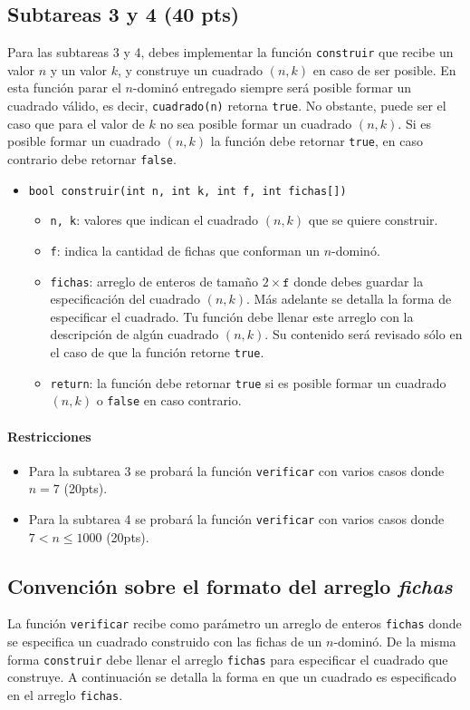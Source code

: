 \documentclass{oci}
\begin{document}
\subsection*{Subtareas 3 y 4 (40 pts)}
Para las subtareas 3 y 4, debes implementar la función \verb+construir+ que recibe un valor $n$ y un valor $k$, y construye un cuadrado $(n,k)$ en caso de ser posible.
En esta función parar el $n$-dominó entregado siempre será posible formar un cuadrado válido, es decir, \verb+cuadrado(n)+ retorna \verb+true+.
No obstante, puede ser el caso que para el valor de $k$ no sea posible formar un cuadrado $(n,k)$.
Si es posible formar un cuadrado $(n,k)$ la función debe retornar \verb+true+, en caso contrario debe retornar \verb+false+.
\begin{itemize}
 \item \verb+bool construir(int n, int k, int f, int fichas[])+
 \begin{itemize}
  \item \verb+n, k+: valores que indican el cuadrado $(n,k)$ que se quiere construir.
  \item \verb+f+: indica la cantidad de fichas que conforman un $n$-dominó.
  \item \verb+fichas+: arreglo de enteros de tamaño $2\times\texttt{f}$ donde debes guardar la especificación del cuadrado $(n,k)$. Más adelante se detalla la forma de especificar el cuadrado.
    Tu función debe llenar este arreglo con la descripción de algún cuadrado $(n,k)$.
Su contenido será revisado sólo en el caso de que la función retorne \verb+true+.
  \item \verb+return+: la función debe retornar \verb+true+ si es posible formar un cuadrado $(n,k)$ o \verb+false+ en caso contrario.
 \end{itemize}
\end{itemize}

\paragraph{Restricciones}
\begin{itemize}
\item Para la subtarea 3 se probará la función \verb+verificar+ con varios casos donde $n= 7$ (20pts).
\item Para la subtarea 4 se probará la función \verb+verificar+ con varios casos donde $7 < n\leq 1000$ (20pts).
\end{itemize}

\subsection*{Convención sobre el formato del arreglo \emph{fichas}}
La función \verb+verificar+ recibe como parámetro un arreglo de enteros \verb+fichas+ donde se especifica un cuadrado construido con las fichas de un $n$-dominó.
De la misma forma \verb+construir+ debe llenar el arreglo \verb+fichas+ para especificar el cuadrado que construye.
A continuación se detalla la forma en que un cuadrado es especificado en el arreglo \verb+fichas+.
\end{document}
